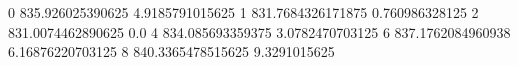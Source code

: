 0 835.926025390625 4.9185791015625
1 831.7684326171875 0.760986328125
2 831.0074462890625 0.0
4 834.085693359375 3.0782470703125
6 837.1762084960938 6.16876220703125
8 840.3365478515625 9.3291015625
